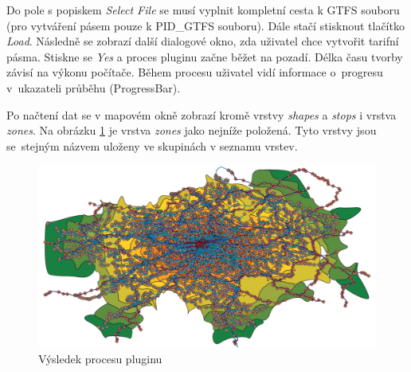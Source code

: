 Do pole s popiskem \textit{Select File} se musí vyplnit kompletní cesta k GTFS  souboru 
(pro vytváření pásem pouze k PID\_GTFS  souboru). Dále stačí stisk\-nout tlačítko \textit{Load}.
Následně se zobrazí další dialogové okno, zda uživatel chce vytvořit tarifní pásma. Stiskne se
\textit{Yes} a proces pluginu začne běžet na pozadí. Délka času tvorby závisí na výkonu počítače. 
Během procesu uživatel vidí informace o~progresu v~ukazateli průběhu (ProgressBar). 

Po načtení dat se v mapovém okně zobrazí kromě vrstvy \textit{shapes} a \textit{stops} i vrstva 
\textit{zones}. Na obrázku \ref{fig:gtfs_loader_vysledek} je vrstva \textit{zones}
jako nejníže položená. Tyto vrstvy jsou se~stejným názvem uloženy ve skupinách v seznamu vrstev.

\begin{figure}[H] \centering
    \includegraphics[width=400pt]{./pictures-dodatek/visualization.png}
    \caption[Výsledek procesu pluginu]{Výsledek procesu pluginu}
	\label{fig:gtfs_loader_vysledek}              
\end{figure} 
